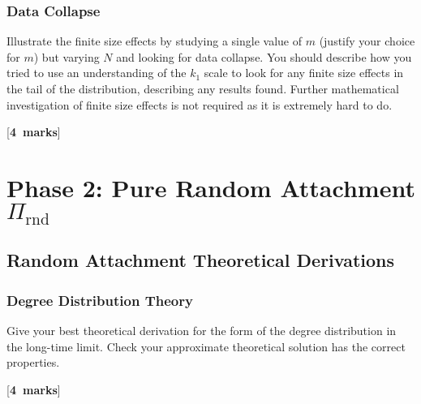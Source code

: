 \documentclass[a4paper,12pt]{article}
\newcounter{nmarks}
\newcommand{\qmarks}[1]{\addtocounter{nmarks}{#1} }
\renewcommand{\qmarks}[1]{\addtocounter{nmarks}{#1} \hspace*{\fill} [\textbf{#1~marks}]}
\begin{document}
\subsubsection{Data Collapse}
Illustrate the finite size effects by studying a single value of $m$ (justify your choice for $m$) but varying $N$ and looking for data collapse. You should describe how you tried to use an understanding of the $k_1$ scale to look for any finite size effects in the tail of the distribution, describing any results found. Further mathematical investigation of finite size effects is not required as it is extremely hard to do. \qmarks{4}




\section{Phase 2: Pure Random Attachment $\Pi_\mathrm{rnd}$}



\subsection{Random Attachment Theoretical Derivations}


\subsubsection{Degree Distribution Theory}
Give your best theoretical derivation for the form of the degree distribution in the long-time limit. Check your approximate theoretical solution has the correct properties. \qmarks{4}
\end{document}
